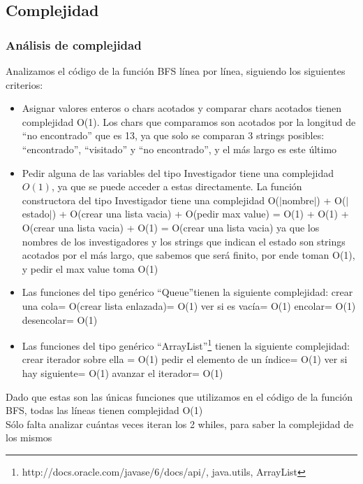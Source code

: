 \subsection{Complejidad}
\subsubsection{Análisis de complejidad}
\indent Analizamos el código de la función BFS línea por línea, siguiendo los
siguientes criterios:
\begin{itemize}
 \item Asignar valores enteros o chars acotados y comparar chars acotados
 tienen complejidad O(1). Los chars que comparamos son acotados por la
 longitud de ``no encontrado'' que es 13, ya que solo se
 comparan 3 strings posibles: ``encontrado'', ``visitado'' y ``no encontrado'',
y
 el más largo es este último
 \item Pedir alguna de las variables del tipo Investigador tiene una complejidad
$O(1)$, 
 ya que se puede acceder a estas directamente.
 \subitem La función constructora del tipo Investigador tiene una complejidad 
 O($|$nombre$|$) + O($|$estado$|$) + O(crear una lista vacia) + O(pedir max
value) =
 O(1) + O(1) + O(crear una lista vacia) + O(1) = O(crear una lista vacia)
 ya que los nombres de los investigadores y los strings que indican el estado
 son strings acotados por el más largo, que sabemos que será finito, por ende
toman O(1), y
 pedir el max value toma O(1)
 \item Las funciones del tipo genérico ``Queue''tienen la siguiente complejidad:
 \subitem crear una cola= O(crear lista enlazada)= O(1)
 \subitem ver si es vacía= O(1)
 \subitem encolar= O(1)
 \subitem desencolar= O(1)
 \item Las funciones del tipo genérico
``ArrayList''\footnote{http://docs.oracle.com/javase/6/docs/api/, java.utils,
ArrayList}  tienen
 la siguiente complejidad:
 \subitem crear iterador sobre ella = O(1)
 \subitem pedir el elemento de un índice= O(1)
 \subitem ver si hay siguiente= O(1)
 \subitem avanzar el iterador= O(1)
 
\end{itemize}

\indent Dado que estas son las únicas funciones que utilizamos en el código de
la función BFS, todas las líneas tienen complejidad O(1)\\
\indent Sólo falta analizar cuántas veces iteran los 2 whiles, para saber la 
complejidad de los mismos\\

